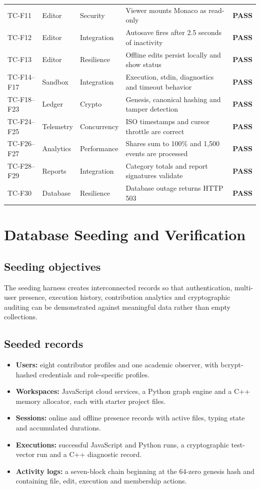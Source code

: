 \documentclass[11pt,a4paper]{article}
\newcommand{\pass}{\textcolor{passgreen}{\textbf{PASS}}}
\begin{document}
\begin{xltabular}{\textwidth}{L{1.3cm} L{1.8cm} L{2.0cm} Y C{1.0cm}}
TC-F11 & Editor & Security & Viewer mounts Monaco as read-only & \pass\\
TC-F12 & Editor & Integration & Autosave fires after 2.5 seconds of inactivity & \pass\\
TC-F13 & Editor & Resilience & Offline edits persist locally and show status & \pass\\
TC-F14--F17 & Sandbox & Integration & Execution, stdin, diagnostics and timeout behavior & \pass\\
TC-F18--F23 & Ledger & Crypto & Genesis, canonical hashing and tamper detection & \pass\\
TC-F24--F25 & Telemetry & Concurrency & ISO timestamps and cursor throttle are correct & \pass\\
TC-F26--F27 & Analytics & Performance & Shares sum to 100\% and 1,500 events are processed & \pass\\
TC-F28--F29 & Reports & Integration & Category totals and report signatures validate & \pass\\
TC-F30 & Database & Resilience & Database outage returns HTTP 503 & \pass\\
\bottomrule
\end{xltabular}
\normalsize

\section{Database Seeding and Verification}

\subsection{Seeding objectives}
The seeding harness creates interconnected records so that authentication,
multi-user presence, execution history, contribution analytics and cryptographic
auditing can be demonstrated against meaningful data rather than empty collections.

\subsection{Seeded records}
\begin{itemize}
    \item \textbf{Users:} eight contributor profiles and one academic observer, with
    bcrypt-hashed credentials and role-specific profiles.
    \item \textbf{Workspaces:} JavaScript cloud services, a Python graph engine and
    a C++ memory allocator, each with starter project files.
    \item \textbf{Sessions:} online and offline presence records with active files,
    typing state and accumulated durations.
    \item \textbf{Executions:} successful JavaScript and Python runs, a cryptographic
    test-vector run and a C++ diagnostic record.
    \item \textbf{Activity logs:} a seven-block chain beginning at the 64-zero
    genesis hash and containing file, edit, execution and membership actions.
\end{itemize}
\end{document}
